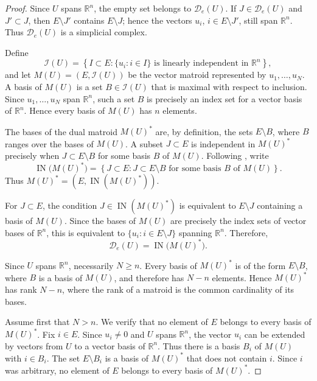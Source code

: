 \documentclass[12pt,reqno]{amsart}
\numberwithin{equation}{section}
\theoremstyle{remark}
\newcommand{\R}{\mathbb R}
\newcommand{\Dcal}{\mathcal D}
\begin{document}
\begin{proof}
	Since \(U\) spans \(\R^n\), the empty set belongs to
	\(\Dcal_e(U)\). If \(J\in\Dcal_e(U)\) and \(J'\subset J\), then
	\(E\setminus J'\) contains \(E\setminus J\); hence the vectors
	\(u_i\), \(i\in E\setminus J'\), still span \(\R^n\). Thus
	\(\Dcal_e(U)\) is a simplicial complex.
	
	Define
	\[
	\mathcal I(U)
	=
	\left\{
	I\subset E:
	\{u_i:i\in I\}\text{ is linearly independent in }\R^n
	\right\},
	\]
	and let \(M(U)=(E,\mathcal I(U))\) be the vector matroid represented
	by \(u_1,\ldots,u_N\). A basis of \(M(U)\) is a set
	\(B\in\mathcal I(U)\) that is maximal with respect to inclusion.
Since
\(u_1,\ldots,u_N\) span \(\R^n\), such a set \(B\) is precisely an index
set for a vector basis of \(\R^n\).  Hence every basis of \(M(U)\) has \(n\)
	elements.
	
	The bases of the dual matroid \(M(U)^*\) are, by definition, the sets
	\(E\setminus B\), where \(B\) ranges over the bases of \(M(U)\). A
	subset \(J\subset E\) is independent in \(M(U)^*\) precisely when
	\(J\subset E\setminus B\) for some basis \(B\) of \(M(U)\). Following
	\cite{BjornerMatroids}, write
	\[
	\operatorname{IN}\bigl(M(U)^*\bigr)
	=
	\left\{
	J\subset E:
	J\subset E\setminus B
	\text{ for some basis \(B\) of \(M(U)\)}
	\right\}.
	\]
	Thus \(M(U)^*=(E,\operatorname{IN}(M(U)^*))\).
	
	For \(J\subset E\), the condition
	\(J\in\operatorname{IN}(M(U)^*)\) is equivalent to
	\(E\setminus J\) containing a basis of \(M(U)\). Since the bases of
	\(M(U)\) are precisely the index sets of vector bases of \(\R^n\),
	this is equivalent to \(\{u_i:i\in E\setminus J\}\) spanning
	\(\R^n\). Therefore,
	\begin{equation}\label{eq:even-deletion-independence-complex}
		\Dcal_e(U)=\operatorname{IN}\bigl(M(U)^*\bigr).
	\end{equation}
	
	Since \(U\) spans \(\R^n\), necessarily \(N\geq n\). Every basis of
	\(M(U)^*\) is of the form \(E\setminus B\), where \(B\) is a basis
	of \(M(U)\), and therefore has \(N-n\) elements. Hence \(M(U)^*\)
	has rank \(N-n\), where the rank of a matroid is the common
	cardinality of its bases.
	
	Assume first that \(N>n\). We verify that no element of \(E\) belongs
	to every basis of \(M(U)^*\). Fix \(i\in E\). Since \(u_i\neq0\) and
	\(U\) spans \(\R^n\), the vector \(u_i\) can be extended by vectors
	from \(U\) to a vector basis of \(\R^n\). Thus there is a basis
	\(B_i\) of \(M(U)\) with \(i\in B_i\). The set \(E\setminus B_i\)
	is a basis of \(M(U)^*\) that does not contain \(i\). Since \(i\) was
	arbitrary, no element of \(E\) belongs to every basis of \(M(U)^*\).
	

\end{proof}
\end{document}
